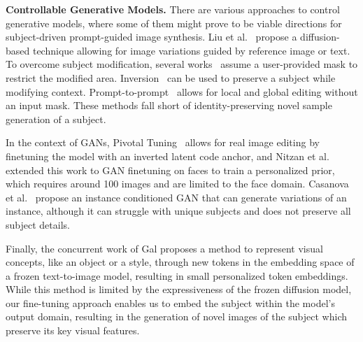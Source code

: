\textbf{Controllable Generative Models. }
There are various approaches to control generative models, where some of them might prove to be viable directions for subject-driven prompt-guided image synthesis.
Liu et al.~\cite{liu2019more} propose a diffusion-based technique allowing for image variations guided by reference image or text.
To overcome subject modification, several works~\cite{nichol2021glide, avrahami2022blendedlatent} assume a user-provided mask to restrict the modified area. Inversion~\cite{choi2021ilvr,dhariwal2021diffusion,ramesh2022hierarchical} can be used to preserve a subject while modifying context. Prompt-to-prompt~\cite{hertz2022prompt} allows for local and global editing without an input mask. These methods fall short of identity-preserving novel sample generation of a subject.

In the context of GANs, Pivotal Tuning~\cite{roich2021pivotal} allows for real image editing by finetuning the model with an inverted latent code anchor, and Nitzan et al.~\cite{nitzan2022mystyle} extended this work to GAN finetuning on faces to train a personalized prior, which requires around 100 images and are limited to the face domain. Casanova et al.~\cite{casanova2021instance} propose an instance conditioned GAN that can generate variations of an instance, although it can struggle with unique subjects and does not preserve all subject details. 
 
Finally, the concurrent work of Gal \etal\cite{gal2022image} proposes a method to represent visual concepts, like an object or a style, through new tokens in the embedding space of a frozen text-to-image model, resulting in small personalized token embeddings. While this method is limited by the expressiveness of the frozen diffusion model, our fine-tuning approach enables us to embed the subject within the model's output domain, resulting in the generation of novel images of the subject which preserve its key visual features.